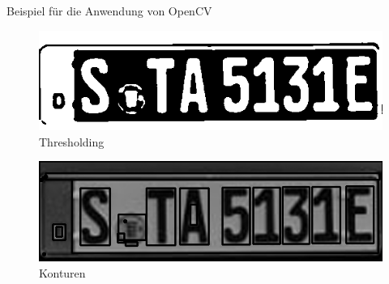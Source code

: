\begin{frame}{Beispiel für die Anwendung von OpenCV}

\begin{figure}
\begin{center}
\includegraphics[scale=0.25]{bilder/Nummer_3_treshold.png}
\caption{Thresholding}
\label{Tresholding}
\end{center}
\end{figure}

\begin{figure}
\begin{center}
\includegraphics[scale=0.25]{bilder/Nummer_4_Konturen.png}
\caption{Konturen}
\label{Konturen}
\end{center}
\end{figure}

\end{frame}

